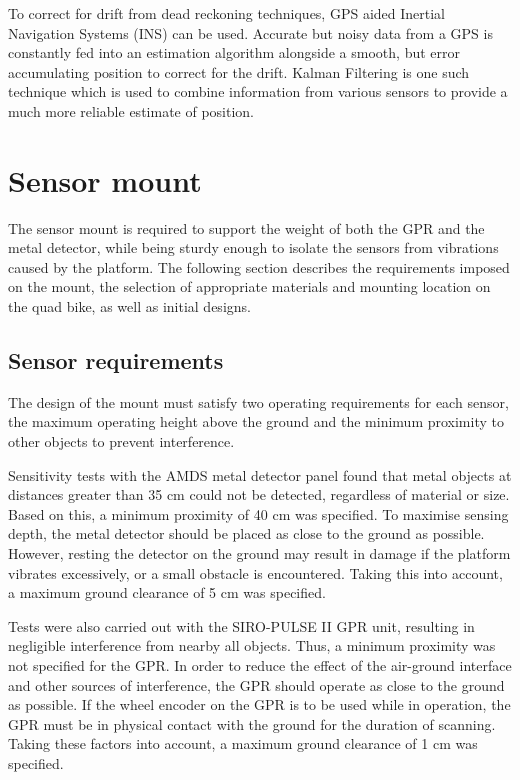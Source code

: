 \documentclass[main.tex]{subfiles}
\begin{document}
To correct for drift from dead reckoning techniques, GPS aided Inertial Navigation Systems (INS) can be used. Accurate but noisy data from a GPS is constantly fed into an estimation algorithm alongside a smooth, but error accumulating position to correct for the drift. Kalman Filtering is one such technique which is used to combine information from various sensors to provide a much more reliable estimate of position.
%

\section{Sensor mount}
The sensor mount is required to support the weight of both the GPR and the metal detector, while being sturdy enough to isolate the sensors from vibrations caused by the platform. The following section describes the requirements imposed on the mount, the selection of appropriate materials and mounting location on the quad bike, as well as initial designs.  

\subsection {Sensor requirements} 
The design of the mount must satisfy two operating requirements for each sensor, the maximum operating height above the ground and the minimum proximity to other objects to prevent interference. 

Sensitivity tests with the AMDS metal detector panel found that metal objects at distances greater than 35 cm could not be detected, regardless of material or size. Based on this, a minimum proximity of 40 cm was specified. To maximise sensing depth, the metal detector should be placed as close to the ground as possible. However, resting the detector on the ground may result in damage if the platform vibrates excessively, or a small obstacle is encountered. Taking this into account, a maximum ground clearance of 5 cm was specified.

Tests were also carried out with the SIRO-PULSE II GPR unit, resulting in negligible interference from nearby all objects. Thus, a minimum proximity was not specified for the GPR. In order to reduce the effect of the air-ground interface and other sources of interference, the GPR should operate as close to the ground as possible. If the wheel encoder on the GPR is to be used while in operation, the GPR must be in physical contact with the ground for the duration of scanning. Taking these factors into account, a maximum ground clearance of 1 cm was specified. 
\end{document}
